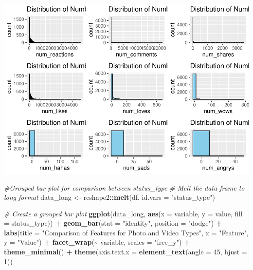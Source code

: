 \documentclass[
]{article}
\newenvironment{Shaded}{\begin{snugshade}}{\end{snugshade}}
\newcommand{\AttributeTok}[1]{\textcolor[rgb]{0.13,0.29,0.53}{#1}}
\newcommand{\CommentTok}[1]{\textcolor[rgb]{0.56,0.35,0.01}{\textit{#1}}}
\newcommand{\DecValTok}[1]{\textcolor[rgb]{0.00,0.00,0.81}{#1}}
\newcommand{\FunctionTok}[1]{\textcolor[rgb]{0.13,0.29,0.53}{\textbf{#1}}}
\newcommand{\NormalTok}[1]{#1}
\newcommand{\OtherTok}[1]{\textcolor[rgb]{0.56,0.35,0.01}{#1}}
\newcommand{\SpecialCharTok}[1]{\textcolor[rgb]{0.81,0.36,0.00}{\textbf{#1}}}
\newcommand{\StringTok}[1]{\textcolor[rgb]{0.31,0.60,0.02}{#1}}
\begin{document}
\includegraphics{Final-Report-6303_files/figure-latex/unnamed-chunk-6-1.pdf}

\begin{Shaded}
\begin{Highlighting}[]
\CommentTok{\#Grouped bar plot for comparison between status\_type}
\CommentTok{\# Melt the data frame to long format}
\NormalTok{data\_long }\OtherTok{\textless{}{-}}\NormalTok{ reshape2}\SpecialCharTok{::}\FunctionTok{melt}\NormalTok{(df, }\AttributeTok{id.vars =} \StringTok{"status\_type"}\NormalTok{)}

\CommentTok{\# Create a grouped bar plot}
\FunctionTok{ggplot}\NormalTok{(data\_long, }\FunctionTok{aes}\NormalTok{(}\AttributeTok{x =}\NormalTok{ variable, }\AttributeTok{y =}\NormalTok{ value, }\AttributeTok{fill =}\NormalTok{ status\_type)) }\SpecialCharTok{+}
  \FunctionTok{geom\_bar}\NormalTok{(}\AttributeTok{stat =} \StringTok{"identity"}\NormalTok{, }\AttributeTok{position =} \StringTok{"dodge"}\NormalTok{) }\SpecialCharTok{+}
  \FunctionTok{labs}\NormalTok{(}\AttributeTok{title =} \StringTok{"Comparison of Features for Photo and Video Types"}\NormalTok{,}
       \AttributeTok{x =} \StringTok{"Feature"}\NormalTok{,}
       \AttributeTok{y =} \StringTok{"Value"}\NormalTok{) }\SpecialCharTok{+}
  \FunctionTok{facet\_wrap}\NormalTok{(}\SpecialCharTok{\textasciitilde{}}\NormalTok{ variable, }\AttributeTok{scales =} \StringTok{"free\_y"}\NormalTok{) }\SpecialCharTok{+}
  \FunctionTok{theme\_minimal}\NormalTok{() }\SpecialCharTok{+}
  \FunctionTok{theme}\NormalTok{(}\AttributeTok{axis.text.x =} \FunctionTok{element\_text}\NormalTok{(}\AttributeTok{angle =} \DecValTok{45}\NormalTok{, }\AttributeTok{hjust =} \DecValTok{1}\NormalTok{))}
\end{Highlighting}
\end{Shaded}
\end{document}
